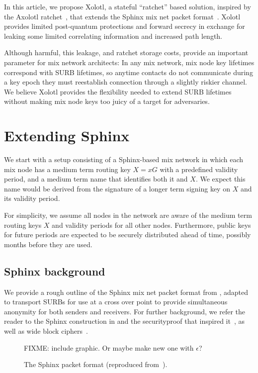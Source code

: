 \documentclass[twoside,letterpaper]{llncs}
\begin{document}
In this article, we propose Xolotl, a stateful ``ratchet'' based
solution, inspired by the Axolotl ratchet~\cite{TextSecure}, that
extends the Sphinx mix net packet format~\cite{Sphinx}.  
Xolotl provides limited post-quantum protections and forward secrecy
in exchange for leaking some limited correlating information and
increased path length.  

Although harmful, this leakage, and ratchet storage costs, provide an
important parameter for mix network architects:  In any mix network,
mix node key lifetimes correspond with SURB lifetimes, so anytime
contacts do not communicate during a key epoch they must reestablish
connection through a slightly riskier channel.  We believe Xolotl
provides the flexibility needed to extend SURB lifetimes without
making mix node keys too juicy of a target for adversaries.


\section{Extending Sphinx}

We start with a setup consisting of a Sphinx-based mix network in
which each mix node has a medium term routing key $X = x G$ with a
predefined validity period, and a medium term name that identifies
both it and $X$.  We expect this name would be derived from the
signature of a longer term signing key on $X$ and its validity period.

For simplicity, we assume all nodes in the network are aware of the
medium term routing keys $X$ and validity periods for all other nodes.
Furthermore, public keys for future periods are expected to be
securely distributed ahead of time, possibly months before they are
used.


\subsection{Sphinx background}

We provide a rough outline of the Sphinx mix net packet format from 
\cite{Sphinx}, adapted to transport SURBs for use at a cross over point
to provide simultaneous anonymity for both senders and receivers.
For further background, we refer the reader to the Sphinx construction
in \cite{Sphinx} and the securityproof that inspired it~\cite{FormalOnion},
as well as wide block ciphers~\cite{Lionness}.

\begin{figure}
  \begin{center}
     FIXME: include graphic. Or maybe make new one with $\epsilon$?
  \end{center}
  \caption{The Sphinx packet format (reproduced from~\cite{Sphinx}).}
  \label{fig:sphinx}
\end{figure}
\end{document}
